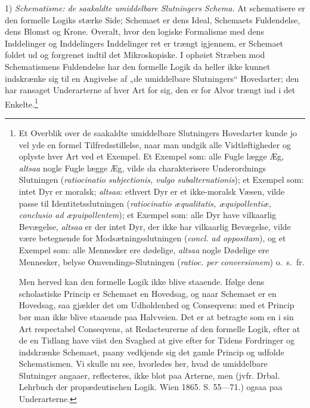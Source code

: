 \documentclass[12pt]{book}
\begin{document}
1) \emph{Schematisme: de saakaldte umiddelbare Slutningers
Schema.} At schematisere er den formelle Logiks
stærke Side; Schemaet er dens Ideal, Schemaets Fuldendelse,
dens Blomst og Krone. Overalt, hvor den logiske Formalisme
med dens Inddelinger og Inddelingers Inddelinger ret
er trængt igjennem, er Schemaet foldet ud og forgrenet indtil
det Mikroskopiske. I ophøiet Stræben mod Schematismens
Fuldendelse har den formelle Logik da heller ikke kunnet indskrænke
sig til en Angivelse af „de umiddelbare Slutningers“
Hovedarter; den har ransaget Underarterne af hver Art for
sig, den er for Alvor trængt ind i det Enkelte.\footnote{Et Overblik over de saakaldte umiddelbare Slutningers Hovedarter
kunde jo vel yde en formel Tilfredsstillelse, naar man undgik alle
Vidtløftigheder og oplyste hver Art ved et Exempel. Et Exempel
som: alle Fugle lægge Æg, \emph{altsaa} nogle Fugle lægge Æg, vilde
da charakterisere Underordnings Slutningen (\textit{ratiocinatio subjectionis,
vulgo subalternationis}); et Exempel som: intet Dyr er moralsk;
\emph{altsaa}: ethvert Dyr er et ikke-moralsk Væsen, vilde passe
til Identitetsslutningen (\textit{ratiocinatio æqualitatis, æquipollentiæ,
conclusio ad æpuipollentem}); et Exempel som: alle Dyr have vilkaarlig
Bevægelse, \emph{altsaa} er der intet Dyr, der ikke har vilkaarlig
Bevægelse, vilde være betegnende for Modsætningsslutningen (\textit{concl.
ad oppositam}), og et Exempel som: alle Mennesker ere dødelige,
\emph{altsaa} nogle Dødelige ere Mennesker, belyse Omvendings-Slutningen
(\textit{ratioc. per conversionem}) o.~s.~fr.

Men herved kan den formelle Logik ikke blive staaende. Ifølge
dens scholastiske Princip er Schemaet en Hovedsag, og naar Schemaet
er en Hovedsag, saa gjælder det om Udholdenhed og Conseqvens:
med et Princip bør man ikke blive staaende paa Halvveien.
Det er at betragte som en i sin Art respectabel Conseqvens, at Redacteurerne
af den formelle Logik, efter at de en Tidlang have viist
den Svaghed at give efter for Tidens Fordringer og indskrænke
Schemaet, paany vedkjende sig det gamle Princip og udfolde Schematismen.
Vi skulle nu see, hvorledes her, hvad de umiddelbare
Slutninger angaaer, reflecteres, ikke blot paa Arterne, men (jvfr.
Drbal. Lehrbuch der propædeutischen Logik. Wien 1865. S. 55---71.)
ogsaa paa Underarterne.

}
\end{document}
